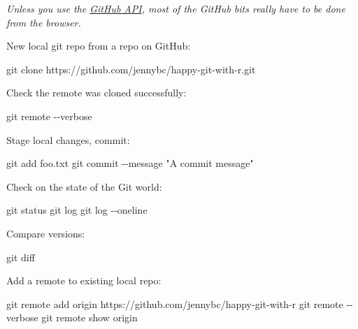 \documentclass[
]{book}
\newenvironment{Shaded}{\begin{snugshade}}{\end{snugshade}}
\newcommand{\NormalTok}[1]{#1}
\begin{document}
\emph{Unless you use the \href{https://developer.github.com/v3/}{GitHub API}, most of the GitHub bits really have to be done from the browser.}

New local git repo from a repo on GitHub:

\begin{Shaded}
\begin{Highlighting}[]
\NormalTok{git clone https://github.com/jennybc/happy{-}git{-}with{-}r.git}
\end{Highlighting}
\end{Shaded}

Check the remote was cloned successfully:

\begin{Shaded}
\begin{Highlighting}[]
\NormalTok{git remote {-}{-}verbose}
\end{Highlighting}
\end{Shaded}

Stage local changes, commit:

\begin{Shaded}
\begin{Highlighting}[]
\NormalTok{git add foo.txt}
\NormalTok{git commit {-}{-}message "A commit message"}
\end{Highlighting}
\end{Shaded}

Check on the state of the Git world:

\begin{Shaded}
\begin{Highlighting}[]
\NormalTok{git status}
\NormalTok{git log}
\NormalTok{git log {-}{-}oneline}
\end{Highlighting}
\end{Shaded}

Compare versions:

\begin{Shaded}
\begin{Highlighting}[]
\NormalTok{git diff}
\end{Highlighting}
\end{Shaded}

Add a remote to existing local repo:

\begin{Shaded}
\begin{Highlighting}[]
\NormalTok{git remote add origin https://github.com/jennybc/happy{-}git{-}with{-}r}
\NormalTok{git remote {-}{-}verbose}
\NormalTok{git remote show origin}
\end{Highlighting}
\end{Shaded}
\end{document}
